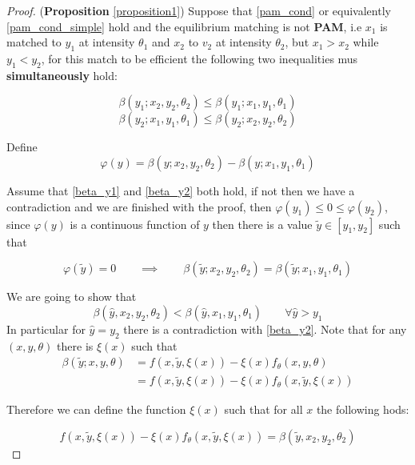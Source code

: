 \documentclass[12pt]{article}
\theoremstyle{definition}
\newcommand{\qiq}{\qquad \implies \qquad}
\begin{document}
\begin{proof}
(\textbf{Proposition} \ref{proposition1}) Suppose that \eqref{pam_cond} or equivalently \eqref{pam_cond_simple} hold and the equilibrium matching is not \textbf{PAM}, i.e  $x_{1}$ is matched to $y_{1}$ at intensity $\theta_{1}$ and $x_{2}$ to $v_{2}$ at intensity $\theta_{2}$, but $x_{1}>x_{2}$ while $y_{1}<y_{2}$, for this match to be efficient the following two inequalities mus \textbf{simultaneously} hold:

\begin{equation}\label{beta_y1}
    \beta(y_1; x_2, y_2, \theta_2) \leq \beta(y_1; x_1, y_1, \theta_1) 
\end{equation}
\begin{equation}\label{beta_y2}
    \beta(y_2; x_1, y_1, \theta_1) \leq \beta(y_2; x_2, y_2, \theta_2) 
\end{equation}

Define $$\varphi(y) = \beta(y; x_2, y_2, \theta_2) - \beta(y; x_1, y_1, \theta_1) $$

Assume that \eqref{beta_y1} and \eqref{beta_y2} both hold, if not then we have a contradiction and we are finished with the proof, then $\varphi(y_1)\leq0\leq \varphi(y_2)$, since $\varphi(y)$ is a continuous function of $y$ then there is a value $\tilde{y} \in [y_1, y_2]$ such that 

\begin{equation}\label{definition_varphi}
    \varphi(\tilde{y}) = 0 \qiq  \beta(\tilde{y}; x_2, y_2, \theta_2) = \beta(\tilde{y}; x_1, y_1, \theta_1) 
\end{equation}

We are going to show that 
\begin{equation}\label{contradiction}
\beta(\hat{y},x_2,y_2,\theta_2)<\beta(\hat{y}, x_1, y_1, \theta_1)\qquad \forall \hat{y}>y_1 
\end{equation}
In particular for $\hat{y} = y_2$ there is a contradiction with \eqref{beta_y2}. 
Note that for any $(x,y,\theta)$ there is $\xi(x)$ such that
\begin{align*}
    \beta(\tilde{y};x,y,\theta) & = f(x,\tilde{y}, \xi(x)) - \xi(x)f_\theta(x,y,\theta)\\&=f(x,\tilde{y}, \xi(x)) - \xi(x)f_\theta(x,\tilde{y}, \xi(x))
\end{align*}

Therefore we can define the function $\xi(x)$ such that for all $x$ the following hods:

\begin{equation}\label{def_xi_1}
f(x,\tilde{y},\xi(x)) - \xi(x)f_\theta(x,\tilde{y}, \xi(x)) = \beta(\tilde{y},x_2,y_2,\theta_2)
\end{equation}


\end{proof}
\end{document}
